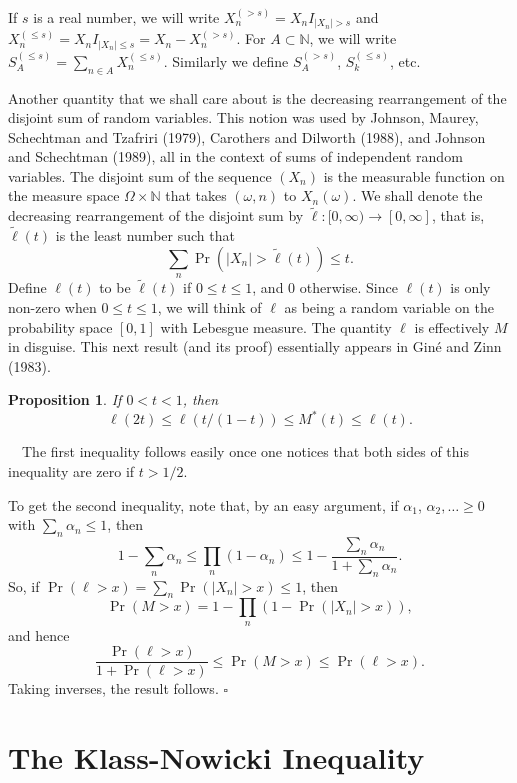 \documentclass[12pt]{article}
\newtheorem{prop}[thm]{Proposition}
\newcommand{\N}{{\mathbb N}}
\newcommand{\smodo}[1]{{\mathopen|#1\mathclose|}}
\newcommand{\Proof}{\medskip\noindent{\bf Proof:}\ \ }
\newcommand{\qed}{\leavevmode\unskip\penalty9999
                  \hbox{}\nobreak\hfill$\square$\goodbreak\medskip}
\begin{document}
If $s$ is a real number, we will write 
$X_n^{(>s)} = X_n I_{\smodo{X_n} > s} $ 
and $X_n^{(\le s)} = X_n I_{\smodo{X_n} \le s} = X_n - X_n^{(>s)}$.
For $A \subset\N$, we will write $S^{(\le s)}_A = \sum_{n
\in A} X^{(\le s)}_n$. 
Similarly we define $S^{(>s)}_A$, 
 $S^{(\le s)}_k$, etc.

Another quantity that we shall care about is the decreasing
rearrangement of the disjoint sum of random variables.  
This notion was used by Johnson, Maurey,
Schechtman  and Tzafriri (1979), Carothers and Dilworth (1988),
and Johnson and Schechtman (1989), all in the context of sums of
independent random variables.
The disjoint
sum of the sequence $(X_n)$ is the measurable function on the measure
space $\Omega \times \N$ that takes $(\omega,n)$ to
$X_n(\omega)$.  We shall denote the decreasing rearrangement of
the disjoint sum by $\tilde \ell:[0,\infty) \to [0,\infty]$, that is,
$\tilde \ell(t)$ is the least number such that 
$$ \sum_n \Pr(\smodo{X_n} > \tilde \ell(t)) \le t .$$
Define $\ell(t)$ to be $\tilde \ell(t)$ if $0 \le t \le
1$, and $0$ otherwise. Since $\ell(t)$ is only non-zero when $0 \le t
\le 1$, we will think of $\ell$
as being a random variable on the 
probability space $[0,1]$ with Lebesgue measure.
The quantity $\ell$ is effectively $M$ in disguise.  This next result 
(and its proof)
essentially appears in Gin\'e and Zinn (1983).

\begin{prop}
\label{ell-max}
 If $0<t < 1$, then 
$$ \ell(2t) \le \ell(t/(1-t)) \le M^*(t) \le\ell(t) .$$
\end{prop}

\Proof  The first inequality follows easily
once one notices that both sides of this inequality are zero if $t >
1/2$. 

To get the second inequality, note that, by an easy argument, if $\alpha_1$, 
$\alpha_2,\dots \ge 0$ with $\sum_n \alpha_n \le 1$, then 
$$ 1-\sum_n \alpha_n \le \prod_n (1-\alpha_n)\le 1 - {\frac{\sum_n \alpha_n
}{ 1 
+ \sum_n \alpha_n}} .$$ So, if $\Pr(\ell > x) = \sum_n \Pr(\smodo{X_n}
> x) 
\le 1$, then $$ \Pr(M > x) = 1-\prod_n (1-\Pr(\smodo{X_n} > x)) ,$$  
and hence $$ {\frac{\Pr(\ell > x) }{ 1+\Pr(\ell>x)}} \le \Pr(M>x) \le 
\Pr(\ell > x) .$$ Taking inverses, the result follows. 
\qed

\section{The Klass-Nowicki Inequality}
\label{Klass-nowicki}
\end{document}
